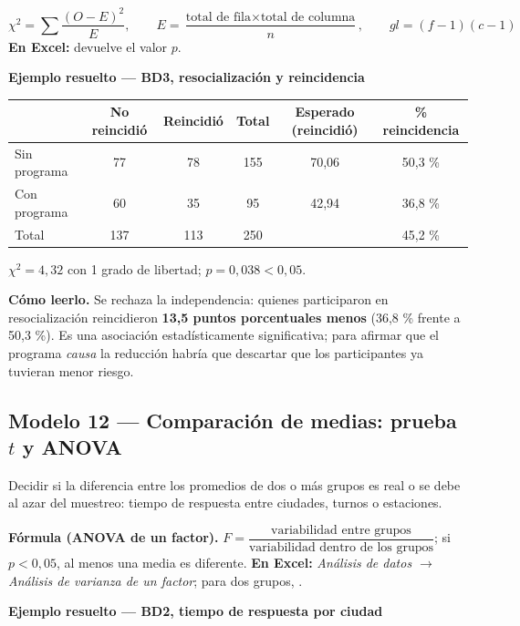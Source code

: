 \[
\chi^2=\sum\frac{(O-E)^2}{E},\qquad E=\frac{\text{total de fila}\times\text{total de columna}}{n},\qquad gl=(f-1)(c-1)
\]
\textbf{En Excel:}  devuelve el valor $p$.

\textbf{Ejemplo resuelto --- BD3, resocialización y reincidencia}

\begin{center}
\small
\begin{tabular}{@{}lccc|cc@{}}
\toprule
& No reincidió & Reincidió & Total & Esperado (reincidió) & \% reincidencia\\
\midrule
Sin programa & 77 & 78 & 155 & 70,06 & 50,3 \%\\
Con programa & 60 & 35 & 95 & 42,94 & 36,8 \%\\
\midrule
Total & 137 & 113 & 250 & & 45,2 \%\\
\bottomrule
\end{tabular}
\end{center}

$\chi^2=4{,}32$ con 1 grado de libertad; $p=0{,}038<0{,}05$.

\textbf{Cómo leerlo.} Se rechaza la independencia: quienes participaron en
resocialización reincidieron \textbf{13,5 puntos porcentuales menos} (36,8 \% frente a
50,3 \%). Es una asociación estadísticamente significativa; para afirmar que el programa
\textit{causa} la reducción habría que descartar que los participantes ya tuvieran
menor riesgo.

\subsection{Modelo 12 --- Comparación de medias: prueba $t$ y ANOVA}

\begin{cajaModelo}
Decidir si la diferencia entre los promedios de dos o más grupos es real o se debe al
azar del muestreo: tiempo de respuesta entre ciudades, turnos o estaciones.
\end{cajaModelo}

\textbf{Fórmula (ANOVA de un factor).} $F=\dfrac{\text{variabilidad entre grupos}}{\text{variabilidad dentro de los grupos}}$; si $p<0{,}05$, al menos una media es diferente.
\textbf{En Excel:} \textit{Análisis de datos $\rightarrow$ Análisis de varianza de un factor}; para dos grupos, .

\textbf{Ejemplo resuelto --- BD2, tiempo de respuesta por ciudad}

